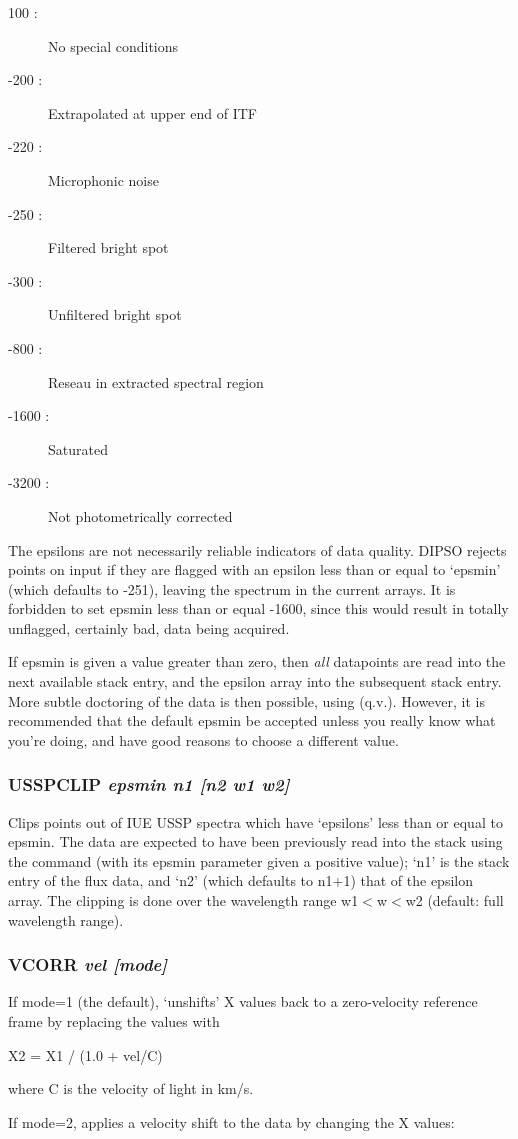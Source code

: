 \documentclass[twoside,11pt,noabs,nolof]{starlink}
\providecommand{\dipcom}[3]{\subsubsection*{\label{COM:#1}\textbf{#1} \emph{#2}}}
\newenvironment{dipdesc}{\begin{description}}{\end{description}}
\providecommand{\dipitem}[2]{ \item[{#1}] {#2} }
\begin{document}
\begin{dipdesc}
\dipitem{  100 : } {No special conditions}
\dipitem{ -200 : } {Extrapolated at upper end of ITF}
\dipitem{ -220 : } {Microphonic noise}
\dipitem{ -250 : } {Filtered bright spot}
\dipitem{ -300 : } {Unfiltered bright spot}
\dipitem{ -800 : } {Reseau in extracted spectral region}
\dipitem{-1600 : } {Saturated}
\dipitem{-3200 : } {Not photometrically corrected}
\end{dipdesc}

The epsilons are not necessarily reliable indicators of data quality.
DIPSO rejects points on input if they are flagged with an epsilon less
than or equal to `epsmin' (which defaults to -251), leaving the
spectrum in the current arrays. It is forbidden to set epsmin less
than or equal -1600, since this would result in totally unflagged,
certainly bad, data being acquired.

If epsmin is given a value greater than zero, then \emph{all}
datapoints are read into the next available stack entry, and the
epsilon array into the subsequent stack entry. More subtle doctoring
of the data is then possible, using   (q.v.). However, it is
recommended that the default epsmin be accepted unless you really know
what you're doing, and have good reasons to choose a different value.

\dipcom{USSPCLIP}{epsmin n1 [n2 w1 w2]}{Removes points from an IUE USSP spectrum based on 'epsilon' values}
Clips points out of IUE USSP spectra which have `epsilons' less than
or equal to epsmin. The data are expected to have been previously read
into the stack using the   command (with its epsmin parameter
given a positive value); `n1' is the stack entry of the flux data, and
`n2' (which defaults to n1+1) that of the epsilon array. The clipping
is done over the wavelength range w1$<$w$<$w2 (default: full
wavelength range).

\dipcom{VCORR}{vel [mode]}{Applies or removes a velocity shift to a set of X values}
If mode=1 (the default),   `unshifts' X values back to a
zero-velocity reference frame by replacing the values with

\begin{terminalv}
X2 = X1 / (1.0 + vel/C)
\end{terminalv}

where C is the velocity of light in km/s.

If mode=2,   applies a velocity shift to the data by changing the
X values:
\end{document}
